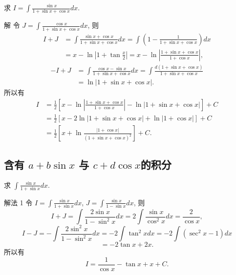 \documentclass[lang=cn,newtx,10pt,scheme=chinese]{elegantbook}
\begin{document}
\begin{example}
  求 $I = \int \frac{\sin x}{1 + \sin x + \cos x} dx$.
\end{example}
\begin{solution}
  解 令 $J = \int \frac{\cos x}{1 + \sin x + \cos x} dx$, 则
  $$
  \begin{aligned}
  I + J &= \int \frac{\sin x + \cos x}{1 + \sin x + \cos x} dx = \int \left( 1 - \frac{1}{1 + \sin x + \cos x} \right) dx \\
  &= x - \ln \left| 1 + \tan \frac{x}{2} \right| = x - \ln \left| \frac{1 + \sin x + \cos x}{1 + \cos x} \right|,
  \end{aligned}
  $$
  $$
  \begin{aligned}
  -I + J &= \int \frac{\cos x - \sin x}{1 + \sin x + \cos x} dx = \int \frac{d(1 + \sin x + \cos x)}{1 + \sin x + \cos x} \\
  &= \ln|1 + \sin x + \cos x|.
  \end{aligned}
  $$
  所以有
  $$
  \begin{aligned}
  I &= \frac{1}{2} \left[ x - \ln \left| \frac{1 + \sin x + \cos x}{1 + \cos x} \right| - \ln|1 + \sin x + \cos x| \right] + C \\
  &= \frac{1}{2} [x - 2 \ln|1 + \sin x + \cos x| + \ln|1 + \cos x|] + C \\
  &= \frac{1}{2} \left[ x + \ln \frac{|1 + \cos x|}{(1 + \sin x + \cos x)^2} \right] + C.
  \end{aligned}
  $$
\end{solution}

\subsection{含有 $a + b\sin x$ 与 $c + d\cos x $的积分}

\begin{example}
  求 $\int \frac{\sin x}{1 + \sin x} d x$.
\end{example}
\begin{solution}
  解法 1 令 $I = \int \frac{\sin x}{1 + \sin x} d x$, $J = \int \frac{\sin x}{1 - \sin x} d x$,
  则
  $$
  I + J = \int \frac{2 \sin x}{1 - \sin^2 x} d x = 2 \int \frac{\sin x}{\cos^2 x} d x = \frac{2}{\cos x},
  $$
  $$
  I - J = - \int \frac{2 \sin^2 x}{1 - \sin^2 x} d x = -2 \int \tan^2 x d x = -2 \int (\sec^2 x - 1) d x
  $$
  $$
  = -2 \tan x + 2x.
  $$
  所以有
  $$
  I = \frac{1}{\cos x} - \tan x + x + C.
  $$
\end{solution}
\end{document}
